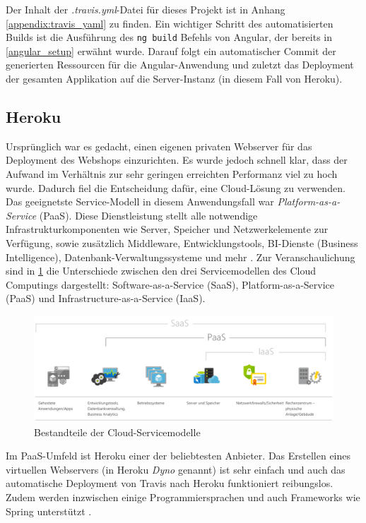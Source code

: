 Der Inhalt der \textit{.travis.yml}-Datei für dieses Projekt ist in Anhang \ref{appendix:travis_yaml} zu finden. Ein wichtiger Schritt des automatisierten Builds ist die Ausführung des \texttt{ng build} Befehls von Angular, der bereits in \cref{angular_setup} erwähnt wurde. Darauf folgt ein automatischer Commit der generierten Ressourcen für die Angular-Anwendung und zuletzt das Deployment der gesamten Applikation auf die Server-Instanz (in diesem Fall von Heroku).

\subsection{Heroku}
Ursprünglich war es gedacht, einen eigenen privaten Webserver für das Deployment des Webshops einzurichten. Es wurde jedoch schnell klar, dass der Aufwand im Verhältnis zur sehr geringen erreichten Performanz viel zu hoch wurde. Dadurch fiel die Entscheidung dafür, eine Cloud-Lösung zu verwenden. Das geeignetste Service-Modell in diesem Anwendungsfall war \textit{Platform-as-a-Service} (PaaS). Diese Dienstleistung stellt alle notwendige Infrastrukturkomponenten wie Server, Speicher und Netzwerkelemente zur Verfügung, sowie zusätzlich Middleware, Entwicklungstools, BI-Dienste (Business Intelligence), Datenbank-Verwaltungssysteme und mehr \cite{Azure2017}. Zur Veranschaulichung sind in \cref{fig:cloud} die Unterschiede zwischen den drei Servicemodellen des Cloud Computings dargestellt: Software-as-a-Service (SaaS), Platform-as-a-Service (PaaS) und Infrastructure-as-a-Service (IaaS).

\begin{figure}[th!]
	\centering
	\includegraphics[width=\linewidth]{bilder/kap8/cloud}
	\caption[Bestandteile der Cloud-Servicemodelle]{Bestandteile der Cloud-Servicemodelle \cite{Azure2017}}
	\label{fig:cloud}
\end{figure}

Im PaaS-Umfeld ist Heroku einer der beliebtesten Anbieter. Das Erstellen eines virtuellen Webservers (in Heroku \textit{Dyno} genannt) ist sehr einfach und auch das automatische Deployment von Travis nach Heroku funktioniert reibungslos. Zudem werden inzwischen einige Programmiersprachen und auch Frameworks wie Spring unterstützt \cite{Coutermarsh2014}.

